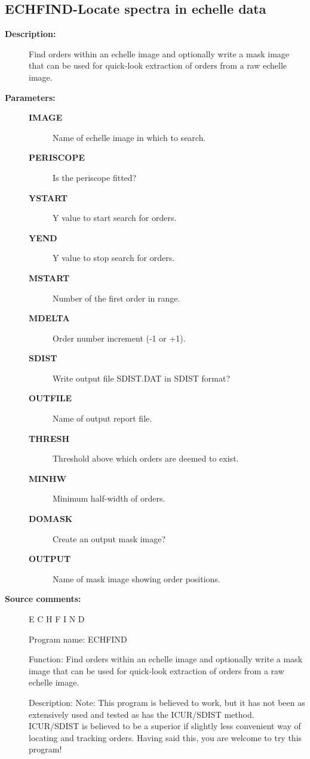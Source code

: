 \begin{description}
\subsection{ECHFIND-\label{ECHFIND}Locate spectra in echelle data}
\begin{description}

\item [\textbf{Description:}]
 Find orders within an echelle image and optionally write a mask
 image that can be used for quick-look extraction of orders from a
 raw echelle image.

\item [\textbf{Parameters:}]
\begin{description}
\item [\textbf{IMAGE}]
 Name of echelle image in which to search.
\item [\textbf{PERISCOPE}]
 Is the periscope fitted?
\item [\textbf{YSTART}]
 Y value to start search for orders.
\item [\textbf{YEND}]
 Y value to stop search for orders.
\item [\textbf{MSTART}]
 Number of the first order in range.
\item [\textbf{MDELTA}]
 Order number increment (-1 or +1).
\item [\textbf{SDIST}]
 Write output file SDIST.DAT in SDIST format?
\item [\textbf{OUTFILE}]
 Name of output report file.
\item [\textbf{THRESH}]
 Threshold above which orders are deemed to exist.
\item [\textbf{MINHW}]
 Minimum half-width of orders.
\item [\textbf{DOMASK}]
 Create an output mask image?
\item [\textbf{OUTPUT}]
 Name of mask image showing order positions.
\end{description}

\item [\textbf{Source comments:}]
\begin{terminalv}
 E C H F I N D

 Program name:
    ECHFIND

 Function:
    Find orders within an echelle image and optionally write a mask
    image that can be used for quick-look extraction of orders from a
    raw echelle image.

 Description:
    Note: This program is believed to work, but it has not been as
    extensively used and tested as has the ICUR/SDIST method.
    ICUR/SDIST is believed to be a superior if slightly less
    convenient way of locating and tracking orders. Having said this,
    you are welcome to try this program!


\end{terminalv}
\end{description}
\end{description}
